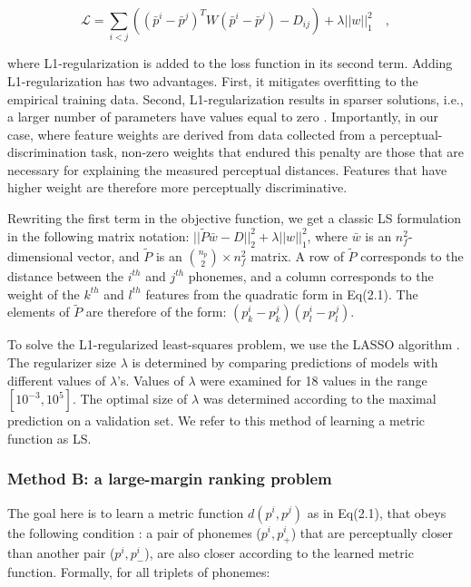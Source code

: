 \begin{equation}
    \mathcal{L} = \sum_{{i} < {j}}{((\bar{p}^i - \bar{p}^j)^TW(\bar{p}^i - \bar{p}^j) - D_{ij})} + \lambda||w||_1^2 \quad ,
\end{equation}

where L1-regularization is added to the loss function in its second term. Adding L1-regularization has two advantages. First, it mitigates overfitting to the empirical training data. Second, L1-regularization results in sparser solutions, i.e., a larger number of parameters have values equal to zero \citep{Tibshirani1996}. Importantly, in our case, where feature weights are derived from data collected from a perceptual-discrimination task, non-zero weights that endured this penalty are those that are necessary for explaining the measured perceptual distances. Features that have higher weight are therefore more perceptually discriminative. 

Rewriting the first term in the objective function, we get a classic LS formulation in the following matrix notation: $||\widetilde{P}\bar{w} - D||_2^2 + \lambda||w||_1^2$, where $\bar{w}$ is an $n_f^2$-dimensional vector, and $\widetilde{P}$ is an ${n_p \choose 2} \times n_f^2$ matrix. A row of $\widetilde{P}$ corresponds to the distance between the $i^{th}$ and $j^{th}$ phonemes, and a column corresponds to the weight of the $k^{th}$ and $l^{th}$ features from the quadratic form in Eq(2.1). The elements of $\widetilde{P}$ are therefore of the form: $(p_k^i-p_k^j)(p_l^i-p_l^j)$.

To solve the L1-regularized least-squares problem, we use the LASSO algorithm \citep{Tibshirani1996}. The regularizer size $\lambda$ is determined by comparing predictions of models with different values of $\lambda$'s. Values of $\lambda$ were examined for 18 values in the range $[10^{-3}, 10^5]$. The optimal size of $\lambda$ was determined according to the maximal prediction on a validation set. We refer to this method of learning a metric function as LS.

\subsubsection{Method B: a large-margin ranking problem} The goal here is to learn a metric function $d(p^i, p^j)$ as in Eq(2.1), that obeys the following condition \citep{Chechik2010}: a pair of phonemes ($p^i, p^i_+$) that are perceptually closer than another pair ($p^i, p^i_-$), are also closer according to the learned metric function. Formally, for all triplets of phonemes:


